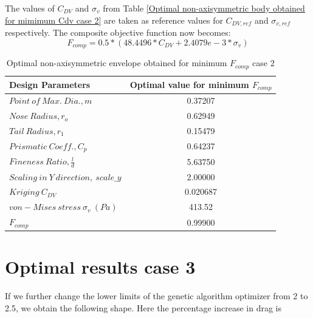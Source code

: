 The values of $C_{DV}$ and $ {\sigma _{v}} $ from Table \ref{Optimal non-axisymmetric body obtained for mimimum Cdv case 2} are taken as reference values for $C_{DV,ref}$ and $ {\sigma _{v,ref}} $ respectively. The composite objective function now becomes:
\begin{equation}
\label{eqn f comp non axi}
F_{comp} = 0.5*(48.4496* C_{DV} + 2.4079e-3 * \sigma _{v})
\end{equation}


\begin{table}[H]
	\centering
	\caption{Optimal non-axisymmetric envelope obtained for minimum $ F_{comp} $ case 2}
	\label{Optimal non-axisymmetric body obtained for mimimum F comp}
	\begin{tabular}{lc}
		\hline \hline
		Design Parameters & Optimal value for minimum $ F_{comp} $    \\ \hline \hline

		$ Point\ of\ Max.\ Dia., m$ & 0.37207      \\  
		$ Nose\ Radius, r _{o} $ & 0.62949    \\
		$ Tail\ Radius, r _{1} $ & 0.15479    \\  
		$ Prismatic\ Coeff., C _{p }$ & 0.64237 \\
		$ Fineness\ Ratio, \frac{l}{d} $ & 5.63750 \\
		$Scaling\ in\ Y\ direction,\ scale\_y$ & 2.00000 \\ \hline \hline
		
		$ Kriging\ C_{DV} $ & 0.020687 \\
		$ von-Mises\ stress\  \sigma _{v} \ (Pa) $ & 413.52 \\
		$ F_{comp}$ & 0.99900 \\
		\hline \hline
	\end{tabular}
\end{table}



\section{Optimal results case 3}
If we further change the lower limits of the genetic algorithm optimizer from 2 to 2.5, we obtain the following shape. Here the percentage increase in drag is 

